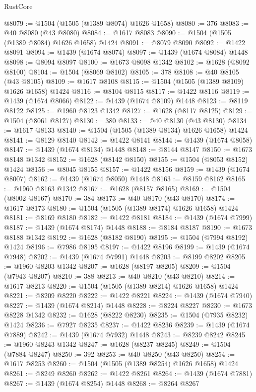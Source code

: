 \begin{lexlean}{RustCore}
\begin{coremodule}
@8079 := @1504 (@1505 (@1389 @8074) @1626 @1658)
@8080 := 376
@8083 := @40 @8080 (@43 @8080)
@8084 := @1617 @8083
@8090 := @1504 (@1505 (@1389 @8084) @1626 @1658) @1424
@8091 := @8079 @8090
@8092 := @1422 @8091
@8094 := @1439 (@1674 @8074)
@8097 := @1439 (@1674 @8084) @1448
@8098 := @8094 @8097
@8100 := @1673 @8098 @1342
@8102 := @1628 (@8092 @8100)
@8104 := @1504 (@8069 @8102)
@8105 := 378
@8108 := @40 @8105 (@43 @8105)
@8109 := @1617 @8108
@8115 := @1504 (@1505 (@1389 @8109) @1626 @1658) @1424
@8116 := @8104 @8115
@8117 := @1422 @8116
@8119 := @1439 (@1674 @8066)
@8122 := @1439 (@1674 @8109) @1448
@8123 := @8119 @8122
@8125 := @1960 @8123 @1342
@8127 := @1628 (@8117 @8125)
@8129 := @1504 (@8061 @8127)
@8130 := 380
@8133 := @40 @8130 (@43 @8130)
@8134 := @1617 @8133
@8140 := @1504 (@1505 (@1389 @8134) @1626 @1658) @1424
@8141 := @8129 @8140
@8142 := @1422 @8141
@8144 := @1439 (@1674 @8058)
@8147 := @1439 (@1674 @8134) @1448
@8148 := @8144 @8147
@8150 := @1673 @8148 @1342
@8152 := @1628 (@8142 @8150)
@8155 := @1504 (@8053 @8152) @1424
@8156 := @8045 @8155
@8157 := @1422 @8156
@8159 := @1439 (@1674 @8007)
@8162 := @1439 (@1674 @8050) @1448
@8163 := @8159 @8162
@8165 := @1960 @8163 @1342
@8167 := @1628 (@8157 @8165)
@8169 := @1504 (@8002 @8167)
@8170 := 384
@8173 := @40 @8170 (@43 @8170)
@8174 := @1617 @8173
@8180 := @1504 (@1505 (@1389 @8174) @1626 @1658) @1424
@8181 := @8169 @8180
@8182 := @1422 @8181
@8184 := @1439 (@1674 @7999)
@8187 := @1439 (@1674 @8174) @1448
@8188 := @8184 @8187
@8190 := @1673 @8188 @1342
@8192 := @1628 (@8182 @8190)
@8195 := @1504 (@7994 @8192) @1424
@8196 := @7986 @8195
@8197 := @1422 @8196
@8199 := @1439 (@1674 @7948)
@8202 := @1439 (@1674 @7991) @1448
@8203 := @8199 @8202
@8205 := @1960 @8203 @1342
@8207 := @1628 (@8197 @8205)
@8209 := @1504 (@7943 @8207)
@8210 := 388
@8213 := @40 @8210 (@43 @8210)
@8214 := @1617 @8213
@8220 := @1504 (@1505 (@1389 @8214) @1626 @1658) @1424
@8221 := @8209 @8220
@8222 := @1422 @8221
@8224 := @1439 (@1674 @7940)
@8227 := @1439 (@1674 @8214) @1448
@8228 := @8224 @8227
@8230 := @1673 @8228 @1342
@8232 := @1628 (@8222 @8230)
@8235 := @1504 (@7935 @8232) @1424
@8236 := @7927 @8235
@8237 := @1422 @8236
@8239 := @1439 (@1674 @7889)
@8242 := @1439 (@1674 @7932) @1448
@8243 := @8239 @8242
@8245 := @1960 @8243 @1342
@8247 := @1628 (@8237 @8245)
@8249 := @1504 (@7884 @8247)
@8250 := 392
@8253 := @40 @8250 (@43 @8250)
@8254 := @1617 @8253
@8260 := @1504 (@1505 (@1389 @8254) @1626 @1658) @1424
@8261 := @8249 @8260
@8262 := @1422 @8261
@8264 := @1439 (@1674 @7881)
@8267 := @1439 (@1674 @8254) @1448
@8268 := @8264 @8267

\end{coremodule}
\end{lexlean}
